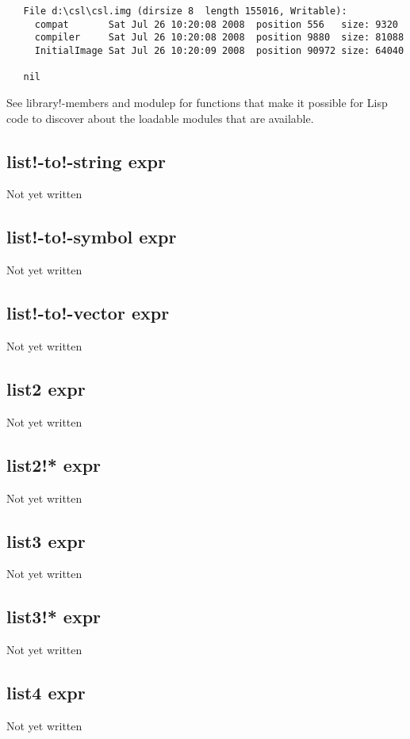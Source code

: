 \documentclass[a4paper,11pt]{article}
\begin{document}
{\begin{verbatim}
   File d:\csl\csl.img (dirsize 8  length 155016, Writable):
     compat       Sat Jul 26 10:20:08 2008  position 556   size: 9320
     compiler     Sat Jul 26 10:20:08 2008  position 9880  size: 81088
     InitialImage Sat Jul 26 10:20:09 2008  position 90972 size: 64040
  
   nil
   \end{verbatim}
  
   See {\ttfamily library!-members} and {\ttfamily modulep} for functions that
   make it possible for Lisp code to discover about the loadable modules that are
   available.

\subsection{\ttfamily list!-to!-string expr}
   Not yet written

\subsection{\ttfamily list!-to!-symbol expr}
   Not yet written

\subsection{\ttfamily list!-to!-vector expr}
   Not yet written

\subsection{\ttfamily list2 expr}
   Not yet written

\subsection{\ttfamily list2!* expr}
   Not yet written

\subsection{\ttfamily list3 expr}
   Not yet written

\subsection{\ttfamily list3!* expr}
   Not yet written

\subsection{\ttfamily list4 expr}
   Not yet written

}
\end{document}
